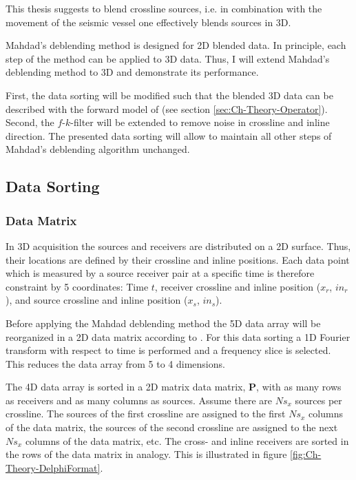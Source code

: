This thesis suggests to blend crossline sources, i.e. in combination with the movement of the seismic vessel one effectively blends sources in 3D.

Mahdad's deblending method is designed for 2D blended data. In principle, each step of the method can be applied to 3D data. Thus, I will extend Mahdad's deblending method to 3D and demonstrate its performance.

First, the data sorting will be modified such that the blended 3D data can be described with the forward model of \citet{Berkhout1982} (see section \ref{sec:Ch-Theory-Operator}). Second, the $f$-$k$-filter will be extended to remove noise in crossline and inline direction. The presented data sorting will allow to maintain all other steps of Mahdad's deblending algorithm unchanged.

\subsection{Data Sorting} \label{sec:Ch-Theory-3dExtension-DataSorting}

\subsubsection*{Data Matrix}

In 3D acquisition the sources and receivers are distributed on a 2D surface. Thus, their locations are defined by their crossline and inline positions. Each data point which is measured by a source receiver pair at a specific time is therefore constraint by 5 coordinates: Time $t$, receiver crossline and inline position ($x_r$, $in_r$), and source crossline and inline position ($x_s$, $in_s$).

Before applying the Mahdad deblending method the 5D data array will be reorganized in a 2D data matrix according to \citet{Delphi-Format}. For this data sorting a 1D Fourier transform with respect to time is performed and a frequency slice is selected. This reduces the data array from 5 to 4 dimensions. 

The 4D data array is sorted in a 2D matrix data matrix, $\mathbf{P}$, with as many rows as receivers and as many columns as sources. Assume there are $Ns_x$ sources per crossline. The sources of the first crossline are assigned to the first $Ns_x$ columns of the data matrix, the sources of the second crossline are assigned to the next $Ns_x$ columns of the data matrix, etc. The cross- and inline receivers are sorted in the rows of the data matrix in analogy. This is illustrated in figure \ref{fig:Ch-Theory-DelphiFormat}. 

